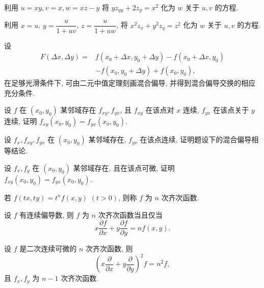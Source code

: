 \documentclass[../数学分析培优讲义.tex]{subfiles}
\begin{document}
\begin{example}
利用 $u=xy,v=x,w=xz-y$ 将 $yz_{yy}+2z_y=x^2$ 化为 $w$ 关于 $u,v$ 的方程.
\end{example}
\exampleblank

\begin{example}
利用 $x=u$, $\displaystyle y=\dfrac{u}{1+uv}$, $\displaystyle z=\dfrac{u}{1+uw}$, 将 $x^2z_x+y^2z_y=z^2$ 化为 $w$ 关于 $u,v$ 的方程.
\end{example}
\exampleblank

\begin{proposition}[\markstar]
设
\[
\begin{aligned}
F(\Delta x,\Delta y)={}&f(x_0+\Delta x,y_0+\Delta y)-f(x_0+\Delta x,y_0)\\
&-f(x_0,y_0+\Delta y)+f(x_0,y_0),
\end{aligned}
\]
在足够光滑条件下, 可由二元中值定理刻画混合偏导, 并得到混合偏导交换的相应充分条件.
\end{proposition}

\begin{example}
设 $f$ 在 $(x_0,y_0)$ 某邻域存在 $f_{xy},f_{yx}$, 且 $f_{xy}$ 在该点对 $x$ 连续, $f_{yx}$ 在该点关于 $y$ 连续, 证明 $f_{xy}(x_0,y_0)=f_{yx}(x_0,y_0)$.
\end{example}
\exampleblank

\begin{example}
设 $f_x,f_{xy},f_{yx}$ 在 $(x_0,y_0)$ 某邻域存在, $f_{yx}$ 在该点连续, 证明题设下的混合偏导相等结论.
\end{example}
\exampleblank

\begin{example}
设 $f_x,f_y$ 在 $(x_0,y_0)$ 某邻域存在, 且在该点可微, 证明 $f_{xy}(x_0,y_0)=f_{yx}(x_0,y_0)$.
\end{example}
\exampleblank

\begin{definition}
若 $f(tx,ty)=t^nf(x,y)$ $(t>0)$, 则称 $f$ 为 $n$ 次齐次函数.
\end{definition}

\begin{proposition}[\markstar]
设 $f$ 有连续偏导数, 则 $f$ 为 $n$ 次齐次函数当且仅当
\[
    x\dfrac{\partial f}{\partial x}+y\dfrac{\partial f}{\partial y}=nf(x,y).
\]
\end{proposition}

\begin{proposition}[\markstar]
设 $f$ 是二次连续可微的 $n$ 次齐次函数, 则
\[
    \left(x\dfrac{\partial}{\partial x}+y\dfrac{\partial}{\partial y}\right)^2f=n^2f,
\]
且 $f_x,f_y$ 为 $n-1$ 次齐次函数.
\end{proposition}
\end{document}
